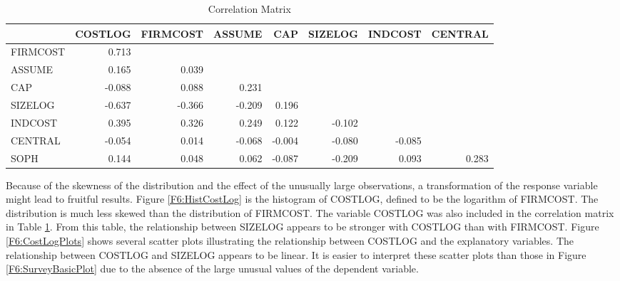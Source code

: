 \begin{table}[h]
 \caption{\label{T6:RiskCorrStats} Correlation
Matrix}
\begin{tabular}{lrrrrrrr}
\hline & COSTLOG & FIRMCOST & ASSUME & CAP & SIZELOG & INDCOST &
CENTRAL \\ \hline FIRMCOST & \multicolumn{1}{r}{0.713} &
 &  &  &  & &  \\
ASSUME & \multicolumn{1}{r}{0.165} & \multicolumn{1}{r}{0.039} &
 &  &  &  &  \\
CAP & \multicolumn{1}{r}{-0.088} & \multicolumn{1}{r}{0.088} &
\multicolumn{1}{r}{0.231} &  &  &  &  \\
SIZELOG & \multicolumn{1}{r}{-0.637} & \multicolumn{1}{r}{-0.366} &
\multicolumn{1}{r}{-0.209} & \multicolumn{1}{r}{0.196} &  &  &  \\
INDCOST & \multicolumn{1}{r}{0.395} & \multicolumn{1}{r}{0.326} &
\multicolumn{1}{r}{0.249} & \multicolumn{1}{r}{0.122} & \multicolumn{1}{r}{
-0.102} &  &  \\
CENTRAL & \multicolumn{1}{r}{-0.054} & \multicolumn{1}{r}{0.014} &
\multicolumn{1}{r}{-0.068} & \multicolumn{1}{r}{-0.004} & \multicolumn{1}{r}{
-0.080} & \multicolumn{1}{r}{-0.085} &  \\
SOPH & \multicolumn{1}{r}{0.144} & \multicolumn{1}{r}{0.048} &
\multicolumn{1}{r}{0.062} & \multicolumn{1}{r}{-0.087} & \multicolumn{1}{r}{
-0.209} & \multicolumn{1}{r}{0.093} & \multicolumn{1}{r}{0.283} \\ \hline
\end{tabular}
\end{table}


Because of the skewness of the distribution and the effect of the
unusually large observations, a transformation of the response
variable might lead to fruitful results. Figure \ref{F6:HistCostLog}
is the histogram of COSTLOG, defined to be the logarithm of
FIRMCOST. The distribution is much less skewed than the distribution
of FIRMCOST. The variable COSTLOG was also included in the
correlation matrix in Table \ref{T6:RiskCorrStats}. From this table,
the relationship between SIZELOG appears to be stronger with COSTLOG
than with FIRMCOST. Figure \ref{F6:CostLogPlots} shows several
scatter plots illustrating the relationship between COSTLOG and the
explanatory variables. The relationship between COSTLOG and SIZELOG
appears to be linear. It is easier to interpret these scatter plots
than those in Figure \ref{F6:SurveyBasicPlot} due to the absence of
the large unusual values of the dependent variable.

